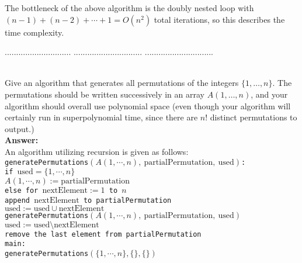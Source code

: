 \documentclass[a4paper,11pt]{article}
\begin{document}
The bottleneck of the above algorithm is the doubly nested loop with $(n - 1) + (n - 2) + \cdots + 1 = O(n^2)$ total iterations, so this describes the time complexity.

\pagebreak

 $.............................$
 $..............................$
          $..............................$\\

\bigskip

\\
Give an algorithm that generates all permutations of the integers $\{ 1 , \ldots , n \}$. 
The permutations should be written successively in an array $A(1, \ldots, n)$,
and your algorithm should overall use polynomial space 
(even though your algorithm will certainly run in superpolynomial time, since there are $n!$ distinct permutations to output.)\\
{\bf Answer:} \\
An algorithm utilizing recursion is given as follows: \\
\texttt{generatePermutations$(A(1, \cdots, n),\ \text{partialPermutation},\ \text{used})$: \\
\indent if $\text{used} = \{ 1, \cdots, n \}$ \\
\indent \indent $A(1, \cdots, n) := \text{partialPermutation}$ \\
\indent else for $\text{nextElement} := 1$ to $n$ \\
\indent \indent append $\text{nextElement}$ to partialPermutation \\
\indent \indent $\text{used} := \text{used} \cup \text{nextElement}$ \\
\indent \indent generatePermutations$(A(1, \cdots, n),\ \text{partialPermutation},\ \text{used})$ \\
\indent \indent $\text{used} := \text{used} \setminus \text{nextElement}$ \\
\indent \indent remove the last element from partialPermutation \\
}
\noindent
\texttt{main: \\
\indent generatePermutations$(\{ 1, \cdots, n \}, \{ \}, \{ \})$
} \\
\end{document}
